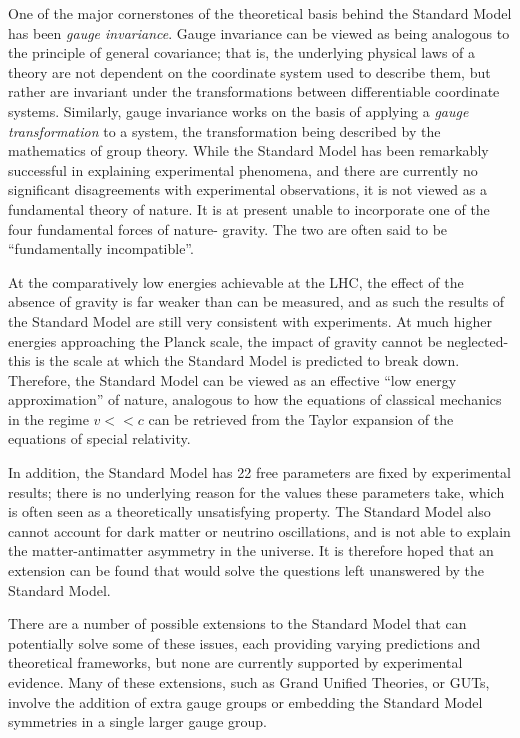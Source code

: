 \documentclass{article}
\begin{document}
One of the major cornerstones of the theoretical basis behind the Standard Model has been \textit{gauge invariance}. Gauge invariance can be viewed as being analogous to the principle of general covariance; that is, the underlying physical laws of a theory are not dependent on the coordinate system used to describe them, but rather are invariant under the transformations between differentiable coordinate systems. Similarly, gauge invariance works on the basis of applying a \textit{gauge transformation} to a system, the transformation being described by the mathematics of group theory. 
While the Standard Model has been remarkably successful in explaining experimental phenomena, and there are currently no significant disagreements with experimental observations, it is not viewed as a fundamental theory of nature. It is at present unable to incorporate one of the four fundamental forces of nature- gravity. The two are often said to be ``fundamentally incompatible''.

At the comparatively low energies achievable at the LHC, the effect of the absence of gravity is far weaker than can be measured, and as such the results of the Standard Model are still very  consistent with experiments. At much higher energies approaching the Planck scale, the impact of gravity cannot be neglected- this is the scale at which the Standard Model is predicted to break down. Therefore, the Standard Model can be viewed as an effective ``low energy approximation'' of nature, analogous to how the equations of classical mechanics in the regime $v<<c$ can be retrieved from the Taylor expansion of the equations of special relativity.

In addition, the Standard Model has 22 free parameters are fixed by experimental results; there is no underlying reason for the values these parameters take, which is often seen as a theoretically unsatisfying property. The Standard Model also cannot account for dark matter or neutrino oscillations, and is not able to explain the matter-antimatter asymmetry in the universe. It is therefore hoped that an extension can be found that would solve the questions left unanswered by the Standard Model. 

There are a number of possible extensions to the Standard Model that can potentially solve some of these issues, each providing varying predictions and theoretical frameworks, but none are currently supported by experimental evidence. Many of these extensions, such as Grand Unified Theories, or GUTs, involve the addition of extra gauge groups or embedding the Standard Model symmetries in a single larger gauge group.
\end{document}
